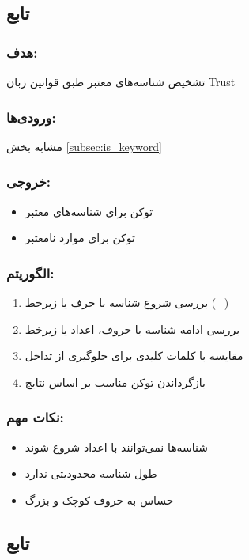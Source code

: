 \documentclass[12pt, a4paper]{report}
\begin{document}
\subsection{تابع }
\label{subsec:is_id}

\subsubsection*{هدف:}
تشخیص شناسه‌های معتبر طبق قوانین زبان Trust

\subsubsection*{ورودی‌ها:} مشابه بخش \ref{subsec:is_keyword}

\subsubsection*{خروجی:}
\begin{itemize}
\item توکن  برای شناسه‌های معتبر
\item توکن  برای موارد نامعتبر
\end{itemize}

\subsubsection*{الگوریتم:}
\begin{enumerate}
\item بررسی شروع شناسه با حرف یا زیرخط (\_)
\item بررسی ادامه شناسه با حروف، اعداد یا زیرخط
\item مقایسه با کلمات کلیدی برای جلوگیری از تداخل
\item بازگرداندن توکن مناسب بر اساس نتایج
\end{enumerate}

\subsubsection*{نکات مهم:}
\begin{itemize}
\item شناسه‌ها نمی‌توانند با اعداد شروع شوند
\item طول شناسه محدودیتی ندارد
\item حساس به حروف کوچک و بزرگ
\end{itemize}

\subsection{تابع }
\label{subsec:is_decimal}
\end{document}

